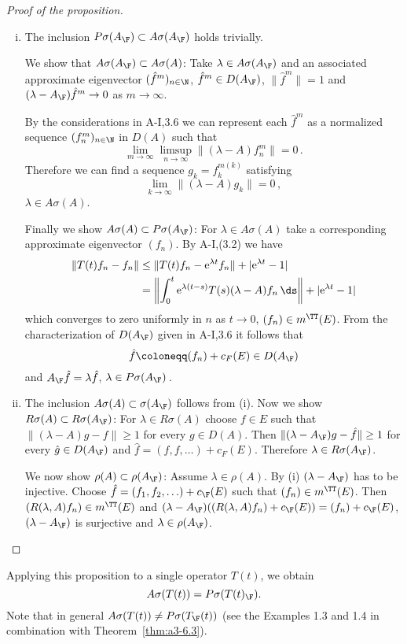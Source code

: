 \begin{proof}[Proof of the proposition]
\begin{enumerate}[(i), wide]
\item 
The inclusion $P\sigma(A_{\F}) \subset A\sigma(A_{\F})$ holds trivially.

We show that $A\sigma(A_{\F}) \subset A\sigma(A)$: Take $\lambda \in A\sigma(A_{\F})$ and an associated approximate eigenvector $({\hat{f}^{m}})_{n \in \N}$, \ie $\hat{f}^{m} \in D(A_{\F})$, $\|\hat{f}^{m}\| = 1$ and $(\lambda-A_{\F})\hat{f}^{m} \to 0$ as $m \to \infty$.

By the considerations in A-I,3.6 we can represent each $\hat{f}^{m}$ as a normalized sequence $(f_{n}^{m})_{n \in \N}$ in $D(A)$ such that
\[
\lim_{m \to \infty} \limsup_{n \to \infty} \|(\lambda-A)f_{n}^{m}\| = 0\,.
\]
Therefore we can find a sequence $g_{k} = f_{k}^{m(k)}$ satisfying
\[
\lim_{k \to \infty} \|(\lambda-A)g_{k}\| = 0\,,
\]
\ie $\lambda \in A\sigma(A)$.

Finally we show $A\sigma(A) \subset P\sigma(A_{\F})$: For $\lambda \in A\sigma(A)$ take a corresponding approximate eigenvector $(f_{n})$.
By A-I,(3.2) we have
\begin{align*}
\|T(t)f_{n} - f_{n}\| &\leq \|T(t)f_{n} - \mathrm{e}^{\lambda t}f_{n}\| + |\mathrm{e}^{\lambda t} - 1| \\
&= \left\|\int_{0}^{t} \mathrm{e}^{\lambda(t-s)}T(s)(\lambda-A)f_{n} \, \ds\right\| + |\mathrm{e}^{\lambda t} -1|
\end{align*}
which converges to zero uniformly in $n$ as $t \to 0$, \ie $(f_{n}) \in m^{\TT}(E)$.
From the characterization of $D(A_{\F})$ given in A-I,3.6 it follows that
\[
\hat{f} \coloneqq (f_{n}) + c_{F}(E) \in D(A_{\F})
\]
and $A_{\F}\hat{f} = \lambda\hat{f}$, \ie $\lambda \in P\sigma(A_{\F})$\,.

\item 
The inclusion $A\sigma(A) \subset \sigma(A_{\F})$ follows from (i). Now we show $R\sigma(A) \subset R\sigma(A_{\F})$:
For $\lambda \in R\sigma(A)$ choose $f \in E$ such that $\|(\lambda-A)g - f\| \geq 1$ for every $g \in D(A)$.
Then $\|(\lambda-A_{\F})g - \hat{f}\| \geq 1$ for every $\hat{g} \in D(A_{\F})$ and $\hat{f} = (f,f,\ldots) + c_{F}(E)$.
Therefore $\lambda \in R\sigma(A_{\F})$.

We now show $\rho(A) \subset \rho(A_{\F})$: Assume $\lambda \in \rho(A)$.
By (i) $(\lambda-A_{\F})$ has to be injective.
Choose $\hat{f} = (f_{1},f_{2},\ldots) + c_{\F}(E)$ such that $(f_{n}) \in m^{\TT}(E)$.
Then $(R(\lambda,A)f_{n}) \in m^{\TT}(E)$ and $(\lambda-A_{\F})((R(\lambda,A)f_{n})+c_{\F}(E)) = (f_{n}) + c_{\F}(E)$, \ie $(\lambda-A_{\F})$ is surjective and $\lambda \in \rho(A_{\F})$.
\end{enumerate}
\end{proof}
Applying this proposition to a single operator $T(t)$, we obtain
\[
A\sigma(T(t)) = P\sigma(T(t)_{\F}) .
\]
Note that in general $A\sigma(T(t)) \neq P\sigma(T_{\F}(t))$ (see the Examples 1.3 and 1.4 in combination with Theorem~\ref{thm:a3-6.3}).

